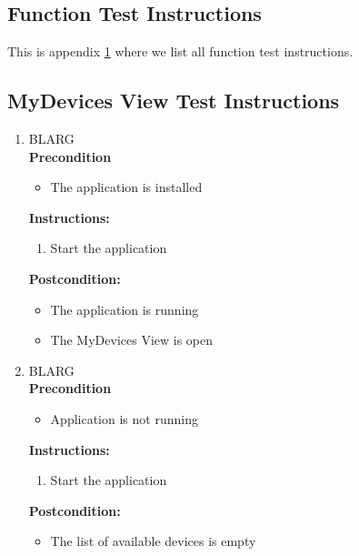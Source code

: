 \documentclass[a4paper]{article}
\newlength{\testlabellength}
\newenvironment{testlist}{\begin{enumerate}[label=\bfseries Instruction \thesubsection.\arabic* , labelindent=0pt, labelwidth=\testlabellength , leftmargin=2cm]}{\end{enumerate}}
\newenvironment{precondition}{
{\color{white}BLARG}\\ 
\textbf{Precondition}
\begin{itemize}[labelindent=0cm, labelwidth=2cm , leftmargin=1cm]
}
{\end{itemize}}
\newenvironment{instruction}{
\textbf{Instructions:}
\begin{enumerate}[label=\bfseries  \arabic*., labelindent=0cm, labelwidth=2cm , leftmargin=1cm]
}
{\end{enumerate}}
\newenvironment{postcondition}{
\textbf{Postcondition:}
\begin{itemize}[labelindent=0cm, labelwidth=2cm , leftmargin=1cm]
}
{\end{itemize}}
\begin{document}
\newpage
\begin{appendices}

\section{Function Test Instructions} \label{appendix:section:functiontest}
This is appendix \ref{appendix:section:functiontest} where we list all function test instructions.


\subsection{MyDevices View Test Instructions}
\begin{testlist}

    \item 
    	\begin{precondition}
    		\item The application is installed
    	\end{precondition}
    	\begin{instruction}
			\item Start the application
    	\end{instruction}
    	\begin{postcondition}
    		\item The application is running
    		\item The MyDevices View is open
    	\end{postcondition}
    
	\item
		\begin{precondition}
			\item Application is not running
    	\end{precondition}
    	\begin{instruction}
    		\item Start the application
    	\end{instruction}
    	\begin{postcondition}
    		\item The list of available devices is empty
    	\end{postcondition}


\end{testlist}
\end{appendices}
\end{document}
